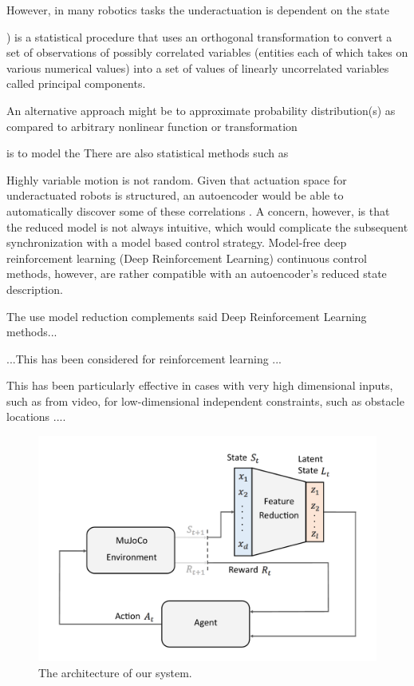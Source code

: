 \documentclass[letterpaper, 10 pt, conference]{ieeeconf}
\begin{document}
  However, in many robotics tasks the underactuation is dependent on the state  


) is a statistical procedure that uses an orthogonal transformation to convert a set of observations of possibly correlated variables (entities each of which takes on various numerical values) into a set of values of linearly uncorrelated variables called principal components.


An alternative approach might be to approximate  probability distribution(s) as compared to arbitrary nonlinear function or transformation

is to model the There are also statistical methods such as 











Highly variable motion is not random.
Given that actuation space for underactuated robots is structured, an autoencoder would be able to automatically discover some of these correlations \cite{AE_hinton2006reducing, ngsparse}.
A concern, however, is that the reduced model is not always intuitive, which would complicate the subsequent synchronization with a model based control strategy.
Model-free deep reinforcement learning (Deep Reinforcement Learning) continuous control methods, however, are rather compatible with an autoencoder's reduced state description.

The use model reduction complements said Deep Reinforcement Learning methods...

...This has been considered for reinforcement learning ... 

This has been particularly effective in cases with very high dimensional inputs, such as from video, for low-dimensional independent constraints, such as obstacle locations \cite{finn2016deep, lynch2019learning}....

\begin{figure}[ht]
    \centering
    \includegraphics[width=\linewidth]{fig-system-arch}
    \caption{
        The architecture of our system.
    }
    \label{fig:system-arch}
\end{figure}
\end{document}
